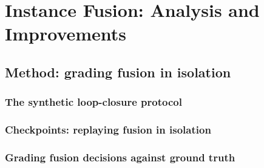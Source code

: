 \chapter{Instance Fusion: Analysis and Improvements}
\label{ch:fusion}


\section{Method: grading fusion in isolation}
\label{sec:fus_method}

\subsection{The synthetic loop-closure protocol}
\label{sec:fus_protocol}

\subsection{Checkpoints: replaying fusion in isolation}
\label{sec:fus_checkpoints}

\subsection{Grading fusion decisions against ground truth}
\label{sec:fus_grading}

